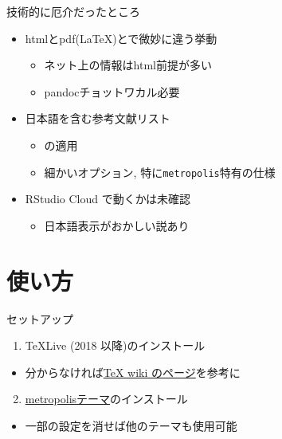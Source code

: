 \documentclass[
  12pt,
  ignorenonframetext,
]{beamer}
\providecommand{\tightlist}{%
  \setlength{\itemsep}{0pt}\setlength{\parskip}{0pt}}
\begin{document}
\begin{frame}[fragile]{技術的に厄介だったところ}
\protect\hypertarget{ux6280ux8853ux7684ux306bux5384ux4ecbux3060ux3063ux305fux3068ux3053ux308d}{}

\begin{itemize}
\tightlist
\item
  htmlとpdf(\LaTeX)とで微妙に違う挙動

  \begin{itemize}
  \tightlist
  \item
    ネット上の情報はhtml前提が多い
  \item
    pandocチョットワカル必要
  \end{itemize}
\item
  日本語を含む参考文献リスト

  \begin{itemize}
  \tightlist
  \item
    \upBibTeX の適用
  \item
    細かいオプション, 特に\texttt{metropolis}特有の仕様
  \end{itemize}
\item
  RStudio Cloud で動くかは未確認

  \begin{itemize}
  \tightlist
  \item
    日本語表示がおかしい説あり
  \end{itemize}
\end{itemize}

\end{frame}

\hypertarget{ux4f7fux3044ux65b9}{%
\section{使い方}\label{ux4f7fux3044ux65b9}}

\begin{frame}{セットアップ}
\protect\hypertarget{ux30bbux30c3ux30c8ux30a2ux30c3ux30d7}{}

\begin{enumerate}
\tightlist
\item
  TeXLive (2018 以降)のインストール
\end{enumerate}

\begin{itemize}
\tightlist
\item
  分からなければ\href{https://texwiki.texjp.org/?TeX\%20Live}{TeX wiki
  のページ}を参考に
\end{itemize}

\begin{enumerate}
\setcounter{enumi}{1}
\tightlist
\item
  \href{https://github.com/matze/mtheme}{metropolisテーマ}のインストール
\end{enumerate}

\begin{itemize}
\tightlist
\item
  一部の設定を消せば他のテーマも使用可能
\end{itemize}

\end{frame}
\end{document}
